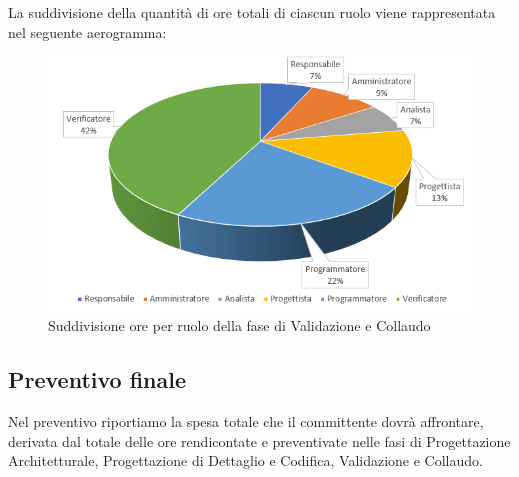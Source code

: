 La suddivisione della quantità di ore totali di ciascun ruolo viene rappresentata nel seguente aerogramma:

\begin{figure}[h]
	\centering
	\includegraphics[scale=2.5]{sezioni/Aerogrammi/AerogrammaValidazione.png}
	\caption{Suddivisione ore per ruolo della fase di Validazione e Collaudo}
\end{figure}


\clearpage
\subsection{Preventivo finale} 
Nel preventivo riportiamo la spesa totale che il committente dovrà affrontare, derivata dal totale delle ore rendicontate e preventivate nelle fasi di Progettazione Architetturale, Progettazione di Dettaglio e Codifica, Validazione e Collaudo.\\

